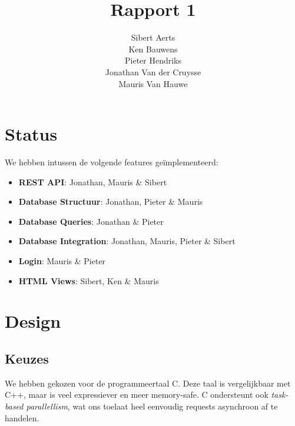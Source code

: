 \documentclass[12pt,a4paper]{article}
\begin{document}
\title{Rapport 1}
\author{Sibert Aerts \\ Ken Bauwens \\ Pieter Hendriks \\ Jonathan Van der Cruysse \\ Mauris Van Hauwe}
\maketitle

\newcommand{\code}[1]{\texttt{#1}}
\newcommand{\CS}{{C\nolinebreak[4]\hspace{-.05em}\raisebox{.4ex}{\relsize{-2}{\textbf{\#}}}}}
\lstset{language=[Sharp]C,basicstyle=\ttfamily}


\section{Status}

We hebben intussen de volgende features ge\"implementeerd:

\begin{itemize}

\item \textbf{REST API}: Jonathan, Mauris \& Sibert

\item \textbf{Database Structuur}: Jonathan, Pieter \& Mauris

\item \textbf{Database Queries}: Jonathan \& Pieter

\item \textbf{Database Integration}: Jonathan, Mauris, Pieter \& Sibert

\item \textbf{Login}: Mauris \& Pieter

\item \textbf{HTML Views}: Sibert, Ken \& Mauris

\end{itemize}

\section{Design}

\subsection{Keuzes}
We hebben gekozen voor de programmeertaal \CS{}. Deze taal is vergelijkbaar met
C++, maar is veel expressiever en meer memory-safe. \CS{} ondersteunt ook 
\textit{task-based parallellism}, wat ons toelaat heel eenvoudig requests 
asynchroon af te handelen.
\end{document}
